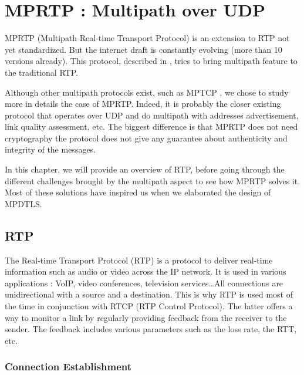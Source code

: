 \chapter{MPRTP : Multipath over UDP}

MPRTP (Multipath Real-time Transport Protocol) is an extension to RTP not yet standardized. But the internet draft \cite{singh-avtcore-mprtp} is constantly evolving (more than 10 versions already). This protocol, described in \cite{singh2013mprtp}, tries to bring multipath feature to the traditional RTP. 

Although other multipath protocols exist, such as MPTCP \cite{RFC6824}, we chose to study more in details the case of MPRTP. Indeed, it is probably the closer existing protocol that operates over UDP and do multipath with addresses advertisement, link quality assessment, etc. The biggest difference is that MPRTP does not need cryptography the protocol does not give any guarantee about authenticity and integrity of the messages.

In this chapter, we will provide an overview of RTP, before going through the different challenges brought by the multipath aspect to see how MPRTP solves it. Most of these solutions have inspired us when we elaborated the design of MPDTLS.

\section{RTP}

The Real-time Transport Protocol (RTP) \cite{RFC3550} is a protocol to deliver real-time information such as audio or video across the IP network.  It is used in various applications : VoIP, video conferences, television services\dots All connections are unidirectional with a source and a destination. This is why RTP is used most of the time in conjunction with RTCP (RTP Control Protocol). The latter offers a way to monitor a link by regularly providing feedback from the receiver to the sender. The feedback includes various parameters such as the loss rate, the RTT, etc.

\subsection{Connection Establishment}

